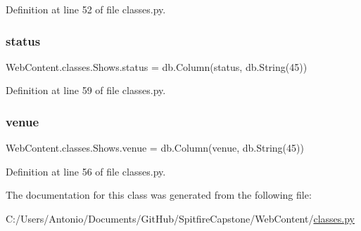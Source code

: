 Definition at line 52 of file classes.\+py.

\mbox{\label{class_web_content_1_1classes_1_1_shows_ae116171a1ecb47ad43e5631115fe9f43}} 
\subsubsection{\texorpdfstring{status}{status}}
{\footnotesize\ttfamily Web\+Content.\+classes.\+Shows.\+status = db.\+Column(\textquotesingle{}status\textquotesingle{}, db.\+String(45))\hspace{0.3cm}{\ttfamily [static]}}



Definition at line 59 of file classes.\+py.

\mbox{\label{class_web_content_1_1classes_1_1_shows_ac931bd921ecb35a0e221ff9133162d2c}} 
\subsubsection{\texorpdfstring{venue}{venue}}
{\footnotesize\ttfamily Web\+Content.\+classes.\+Shows.\+venue = db.\+Column(\textquotesingle{}venue\textquotesingle{}, db.\+String(45))\hspace{0.3cm}{\ttfamily [static]}}



Definition at line 56 of file classes.\+py.



The documentation for this class was generated from the following file\+:\begin{DoxyCompactItemize}
\item 
C\+:/\+Users/\+Antonio/\+Documents/\+Git\+Hub/\+Spitfire\+Capstone/\+Web\+Content/\hyperlink{classes_8py}{classes.\+py}\end{DoxyCompactItemize}
